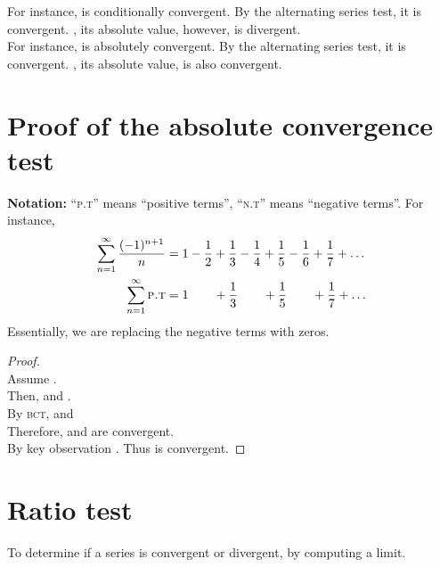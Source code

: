 For instance,  is conditionally convergent. By the alternating series test, it is convergent. , its absolute value, however, is divergent. \\
For instance,  is absolutely convergent. By the alternating series test, it is convergent. , its absolute value, is also convergent.

\newpage
\section{Proof of the absolute convergence test}
\textbf{Notation:} ``\textsc{p.t}'' means ``positive terms'', ``\textsc{n.t}'' means ``negative terms''. For instance, \begin{align*}
  \sum_{n = 1}^{\infty} \frac{(-1)^{n+1}}{n} & = 1 - \frac{1}{2} + \frac{1}{3} - \frac{1}{4} + \frac{1}{5} - \frac{1}{6} + \frac{1}{7} + \dots \\
  \sum_{n = 1}^{\infty} \text{\textsc{p.t}}  & = 1 \qquad + \frac{1}{3} \qquad + \frac{1}{5} \qquad + \frac{1}{7} + \dots                      \\
\end{align*}
Essentially, we are replacing the negative terms with zeros.
\begin{proof}~\\
  Assume . \\
  Then,  and . \\
  By \textsc{bct},  and  \\
  Therefore,  and  are convergent.  \\
  By key observation . Thus  is convergent.
\end{proof}


\newpage
\section{Ratio test}
To determine if a series is convergent or divergent, by computing a limit. \\

